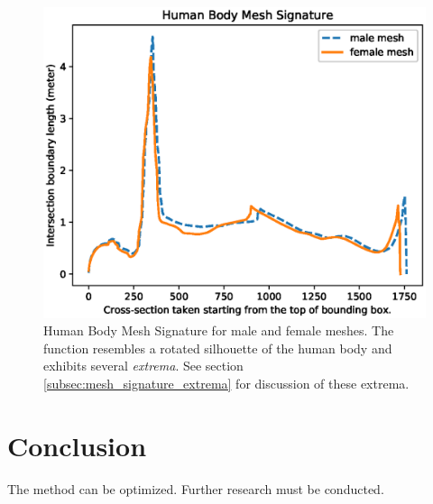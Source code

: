 \documentclass[runningheads, orivec]{llncs}
\begin{document}
\begin{figure}[H]
	\begin{center}
		\includegraphics[width=\linewidth]{Figure_1.eps}
	\end{center}
	\caption{Human Body Mesh Signature for male and female meshes. The 
		function resembles a rotated silhouette of the human body and exhibits 
		several \textit{extrema}. See section 
		\ref{subsec:mesh_signature_extrema} for discussion of these extrema.}
	\label{fig:qualitative_eval}
\end{figure}


\section{Conclusion}

The method can be optimized. Further research must be conducted.
%
%
%


%
\end{document}
